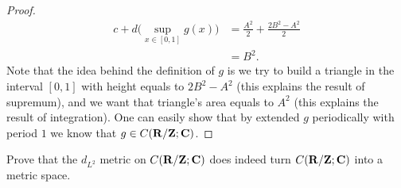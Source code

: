 \begin{proof}
\begin{align*}
        c + d \big(\sup_{x \in [0, 1]} g(x)\big) & = \frac{A^2}{2} + \frac{2 B^2 - A^2}{2} \\
                                                 & = B^2.
    \end{align*}
    Note that the idea behind the definition of \(g\) is we try to build a triangle in the interval \([0, 1]\) with height equals to \(2 B^2 - A^2\) (this explains the result of supremum), and we want that triangle's area equals to \(A^2\) (this explains the result of integration).
    One can easily show that by extended \(g\) periodically with period \(1\) we know that \(g \in C(\mathbf{R} / \mathbf{Z} ; \mathbf{C})\).
\end{proof}

\begin{exercise}\label{ex 5.2.4}
    Prove that the \(d_{L^2}\) metric on \(C(\mathbf{R} / \mathbf{Z} ; \mathbf{C})\) does indeed turn \(C(\mathbf{R} / \mathbf{Z} ; \mathbf{C})\) into a metric space.
\end{exercise}

